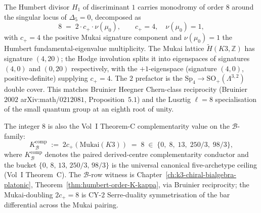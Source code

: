 \begin{remark}[Humbert $H_1$ monodromy order $8 = 2 c_+ \nu(\mu_0)$ and Theorem-C complementarity $\kappa_{\mathrm{ch}} + \kappa_{\mathrm{ch}}^! = 8$]
\label{rem:H1-humbert-order-8-decomposition}
The Humbert divisor $H_1$ of discriminant $1$ carries monodromy of order $8$ around the singular locus of $\Delta_5 = 0$, decomposed as
\[
 8 \;=\; 2 \cdot c_+ \cdot \nu(\mu_0), \qquad c_+ = 4, \quad \nu(\mu_0) = 1,
\]
with $c_+ = 4$ the positive Mukai signature component and $\nu(\mu_0) = 1$ the Humbert fundamental-eigenvalue multiplicity. The Mukai lattice $\widetilde H(K3, \mathbb{Z})$ has signature $(4, 20)$; the Hodge involution splits it into eigenspaces of signatures $(4, 0)$ and $(0, 20)$ respectively, with the $+1$-eigenspace (signature $(4, 0)$, positive-definite) supplying $c_+ = 4$. The $2$ prefactor is the $\mathrm{Sp}_4 \to \mathrm{SO}_+(\Lambda^{3, 2})$ double cover. This matches Bruinier Heegner Chern-class reciprocity (Bruinier~$2002$ arXiv:math/$0212081$, Proposition~$5.1$) and the Lusztig $\ell = 8$ specialisation of the small quantum group at an eighth root of unity.

The integer $8$ is also the Vol~I Theorem-C complementarity value on the $\mathcal{B}$-family:
\[
 K_{\mathcal B}^{\mathrm{comp}} \;:=\; 2 c_+(\mathrm{Mukai}(K3)) \;=\; 8 \;\in\; \bigl\{0,\; 8,\; 13,\; 250/3,\; 98/3\bigr\},
\]
where $K_{\mathcal B}^{\mathrm{comp}}$ denotes the paired derived-centre complementarity conductor and the bucket $\{0,\, 8,\, 13,\, 250/3,\, 98/3\}$ is the universal canonical five-archetype ceiling (Vol~I Theorem~C). The $\mathcal{B}$-row witness is Chapter~\ref{ch:k3-chiral-bialgebra-platonic}, Theorem~\ref{thm:humbert-order-K-kappa}, via Bruinier reciprocity; the Mukai-doubling $2 c_+ = 8$ is CY-$2$ Serre-duality symmetrisation of the bar differential across the Mukai pairing.
\end{remark}

